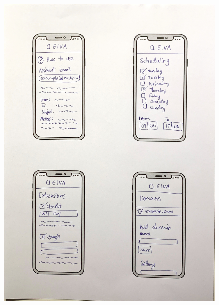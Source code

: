 \documentclass{article}
\begin{document}
 \begin{figure}
	\centering
	\begin{minipage}{.5\textwidth}
		\centering
		\includegraphics[width=1\linewidth]{drawing-phone-1.jpg}

\end{minipage}
\end{figure}
\end{document}
